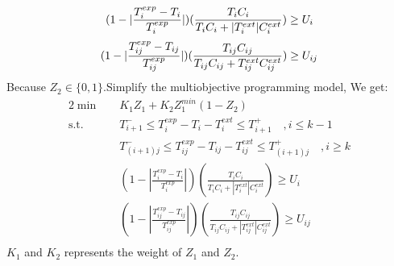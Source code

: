 \documentclass[12pt,a4paper]{article}
\begin{document}
\begin{equation}
	(1-|\frac{T_i^{exp}-T_i}{T_i^{exp}}|)(\frac{T_iC_i}{T_iC_i+|T_i^{ext}|C_i^{ext}})\geq U_i\\
\end{equation}
\begin{equation}
	(1-|\frac{T_{ij}^{exp}-T_{ij}}{T_{ij}^{exp}}|)(\frac{T_{ij}C_{ij}}{T_{ij}C_{ij}+T_{ij}^{ext}C_{ij}^{ext}})\geq U_{ij}\\
\end{equation}
Because $Z_2\in \{0,1\}$.Simplify the multiobjective programming model, We get:
\begin{alignat}{2}
\min \quad & K_1Z_1+K_2Z_1^{min}(1-Z_2)\\
\mbox{s.t.}\quad
& T_{i+1}^-\leq T_i^{exp}-T_i-T_i^{ext}\leq T_{i+1}^+ \quad ,i\leq k-1\\
& T_{(i+1)j}^-\leq T_{ij}^{exp}-T_{ij}-T_{ij}^{ext}\leq T_{(i+1)j}^+ \quad, i\geq k\\
& (1-|\frac{T_i^{exp}-T_i}{T_i^{exp}}|)(\frac{T_iC_i}{T_iC_i+|T_i^{ext}|C_i^{ext}})\geq U_i\\
& (1-|\frac{T_{ij}^{exp}-T_{ij}}{T_{ij}^{exp}}|)(\frac{T_{ij}C_{ij}}{T_{ij}C_{ij}+|T_{ij}^{ext}|C_{ij}^{ext}})\geq U_{ij}\\
\end{alignat}
$K_1$ and $K_2$ represents the weight of $Z_1$ and $Z_2$.
\end{document}
